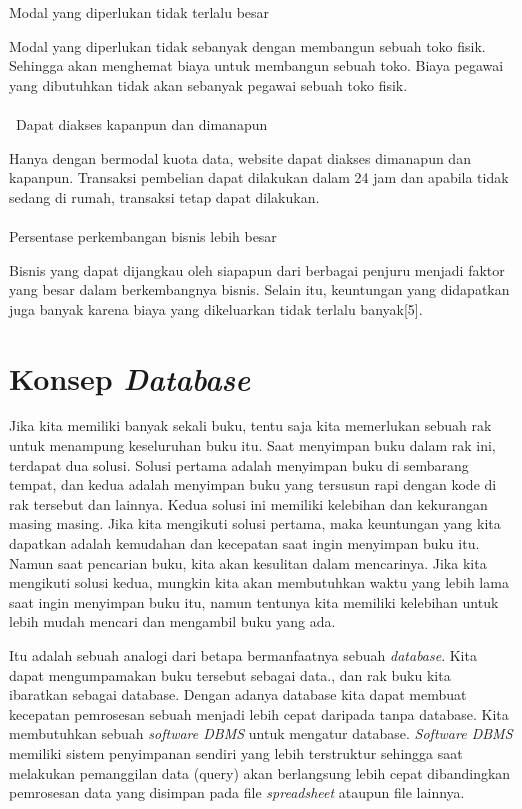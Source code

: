 Modal yang diperlukan tidak terlalu besar\\
\par Modal yang diperlukan tidak sebanyak dengan membangun sebuah toko fisik. Sehingga akan menghemat biaya untuk membangun sebuah toko. Biaya pegawai yang dibutuhkan tidak akan sebanyak pegawai sebuah toko fisik. \\\\\
Dapat diakses kapanpun dan dimanapun \\
\par Hanya dengan bermodal kuota data, website dapat diakses dimanapun dan kapanpun. Transaksi pembelian dapat dilakukan dalam 24 jam dan apabila tidak sedang di rumah, transaksi tetap dapat dilakukan. \\\\
Persentase perkembangan bisnis lebih besar \\
\par Bisnis yang dapat dijangkau oleh siapapun dari berbagai penjuru menjadi faktor yang besar dalam berkembangnya bisnis. Selain itu, keuntungan yang didapatkan juga banyak karena biaya yang dikeluarkan tidak terlalu banyak[5].

\section{Konsep \textit{Database}}
Jika kita memiliki banyak sekali buku, tentu saja kita memerlukan sebuah rak untuk menampung keseluruhan buku itu. Saat menyimpan buku dalam rak ini, terdapat dua solusi. Solusi pertama adalah menyimpan buku di sembarang tempat, dan kedua adalah menyimpan buku yang tersusun rapi dengan kode di rak tersebut dan lainnya. Kedua solusi ini memiliki kelebihan dan kekurangan masing masing. Jika kita mengikuti solusi pertama, maka keuntungan yang kita dapatkan adalah kemudahan dan kecepatan saat ingin menyimpan buku itu. Namun saat pencarian buku, kita akan kesulitan dalam mencarinya. Jika kita mengikuti solusi kedua, mungkin kita akan membutuhkan waktu yang lebih lama saat ingin menyimpan buku itu, namun tentunya kita memiliki kelebihan untuk lebih mudah mencari dan mengambil buku yang ada.
\par Itu adalah sebuah analogi dari betapa bermanfaatnya sebuah \textit{database}. Kita dapat mengumpamakan buku tersebut sebagai data., dan rak buku kita ibaratkan sebagai database. Dengan adanya database kita dapat membuat kecepatan pemrosesan sebuah menjadi lebih cepat daripada tanpa database. Kita membutuhkan sebuah \textit{software DBMS} untuk mengatur database. \textit{Software DBMS} memiliki sistem penyimpanan sendiri yang lebih terstruktur sehingga saat melakukan pemanggilan data (query) akan berlangsung lebih cepat dibandingkan pemrosesan data yang disimpan pada file \textit{spreadsheet} ataupun file lainnya.

